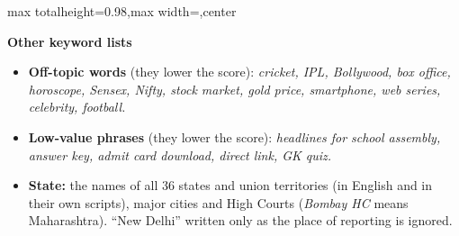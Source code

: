 \documentclass[10pt,a4paper]{article}
\newcommand{\kw}[1]{\textit{#1}}
\newcommand{\lbl}[1]{\textbf{#1}}
\begin{document}
\begin{adjustbox}{max totalheight=0.98\textheight,max width=\textwidth,center}
\begin{minipage}{\textwidth}
\lbl{Other keyword lists}

\begin{itemize}
  \item \lbl{Off-topic words} (they lower the score): \kw{cricket, IPL, Bollywood, box office, horoscope, Sensex, Nifty, stock market, gold price, smartphone, web series, celebrity, football.}
  \item \lbl{Low-value phrases} (they lower the score): \kw{headlines for school assembly, answer key, admit card download, direct link, GK quiz.}
  \item \lbl{State:} the names of all 36 states and union territories (in English and in their own scripts), major cities and High Courts (\kw{Bombay HC} means Maharashtra). ``New Delhi'' written only as the place of reporting is ignored.
\end{itemize}

\end{minipage}
\end{adjustbox}

\newpage
\end{document}
